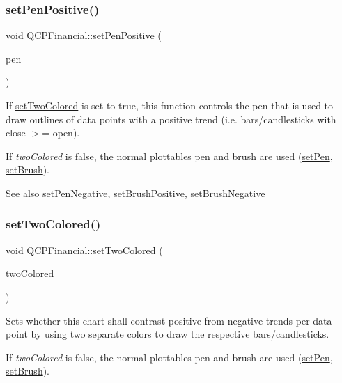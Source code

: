 \subsubsection{\texorpdfstring{set\+Pen\+Positive()}{setPenPositive()}}
{\footnotesize\ttfamily void Q\+C\+P\+Financial\+::set\+Pen\+Positive (\begin{DoxyParamCaption}\item[{const Q\+Pen \&}]{pen }\end{DoxyParamCaption})}

If \hyperlink{class_q_c_p_financial_a138e44aac160a17a9676652e240c5f08}{set\+Two\+Colored} is set to true, this function controls the pen that is used to draw outlines of data points with a positive trend (i.\+e. bars/candlesticks with close $>$= open).

If {\itshape two\+Colored} is false, the normal plottable\textquotesingle{}s pen and brush are used (\hyperlink{class_q_c_p_abstract_plottable_ab74b09ae4c0e7e13142fe4b5bf46cac7}{set\+Pen}, \hyperlink{class_q_c_p_abstract_plottable_a7a4b92144dca6453a1f0f210e27edc74}{set\+Brush}).

\begin{DoxySeeAlso}{See also}
\hyperlink{class_q_c_p_financial_afe5c07e94ccea01a75b3a2476993c346}{set\+Pen\+Negative}, \hyperlink{class_q_c_p_financial_a5ebff2b1764efd07cc44942e67821829}{set\+Brush\+Positive}, \hyperlink{class_q_c_p_financial_a8bbdd87629f9144b3ef51af660c0961a}{set\+Brush\+Negative} 
\end{DoxySeeAlso}
\hypertarget{class_q_c_p_financial_a138e44aac160a17a9676652e240c5f08}{}\label{class_q_c_p_financial_a138e44aac160a17a9676652e240c5f08} 
\subsubsection{\texorpdfstring{set\+Two\+Colored()}{setTwoColored()}}
{\footnotesize\ttfamily void Q\+C\+P\+Financial\+::set\+Two\+Colored (\begin{DoxyParamCaption}\item[{bool}]{two\+Colored }\end{DoxyParamCaption})}

Sets whether this chart shall contrast positive from negative trends per data point by using two separate colors to draw the respective bars/candlesticks.

If {\itshape two\+Colored} is false, the normal plottable\textquotesingle{}s pen and brush are used (\hyperlink{class_q_c_p_abstract_plottable_ab74b09ae4c0e7e13142fe4b5bf46cac7}{set\+Pen}, \hyperlink{class_q_c_p_abstract_plottable_a7a4b92144dca6453a1f0f210e27edc74}{set\+Brush}).

